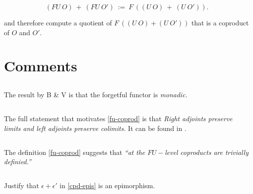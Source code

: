 \documentclass{amsart}
\begin{document}
\begin{equation}\label{fu-coprod}
	(FU \ O) \ + \ (FU \ O') \ := \ F \ \left( (U \ O) \ + \ (U \ O')
	\right).
\end{equation}

and therefore compute a quotient of $F \ \left( (U \ O) + (U \ O')
\right)$ that is a coproduct of $O$ and $O'$.

\section{Comments}

\subsection{} The result by B \& V is that the forgetful functor is \emph{monadic.}

\subsection{} The full statement that motivates \eqref{fu-coprod} is that
\emph{Right adjoints preserve limits and left adjoints preserve colimits.}
It can be found in \cite{riehl-ctic}.

\subsection{} The definition \eqref{fu-coprod} suggests that
\emph{``at the $FU-$level coproducts are trivially definied.''}

\subsection{} Justify that $\epsilon + \epsilon'$ in \eqref{cpd-epis} is
an epimorphism.



\end{document}
